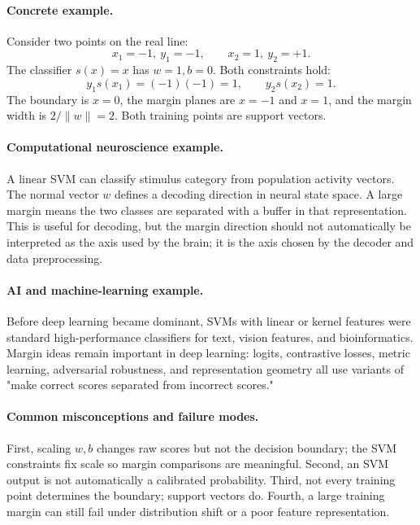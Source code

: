 \paragraph{Concrete example.}
Consider two points on the real line:
\[
x_1=-1,\ y_1=-1,\qquad x_2=1,\ y_2=+1.
\]
The classifier \(s(x)=x\) has \(w=1,b=0\). Both constraints hold:
\[
y_1s(x_1)=(-1)(-1)=1,\qquad y_2s(x_2)=1.
\]
The boundary is \(x=0\), the margin planes are \(x=-1\) and \(x=1\), and the margin width is \(2/\|w\|=2\). Both training points are support vectors.

\paragraph{Computational neuroscience example.}
A linear SVM can classify stimulus category from population activity vectors. The normal vector \(w\) defines a decoding direction in neural state space. A large margin means the two classes are separated with a buffer in that representation. This is useful for decoding, but the margin direction should not automatically be interpreted as the axis used by the brain; it is the axis chosen by the decoder and data preprocessing.

\paragraph{AI and machine-learning example.}
Before deep learning became dominant, SVMs with linear or kernel features were standard high-performance classifiers for text, vision features, and bioinformatics. Margin ideas remain important in deep learning: logits, contrastive losses, metric learning, adversarial robustness, and representation geometry all use variants of "make correct scores separated from incorrect scores."

\paragraph{Common misconceptions and failure modes.}
First, scaling \(w,b\) changes raw scores but not the decision boundary; the SVM constraints fix scale so margin comparisons are meaningful. Second, an SVM output is not automatically a calibrated probability. Third, not every training point determines the boundary; support vectors do. Fourth, a large training margin can still fail under distribution shift or a poor feature representation.

